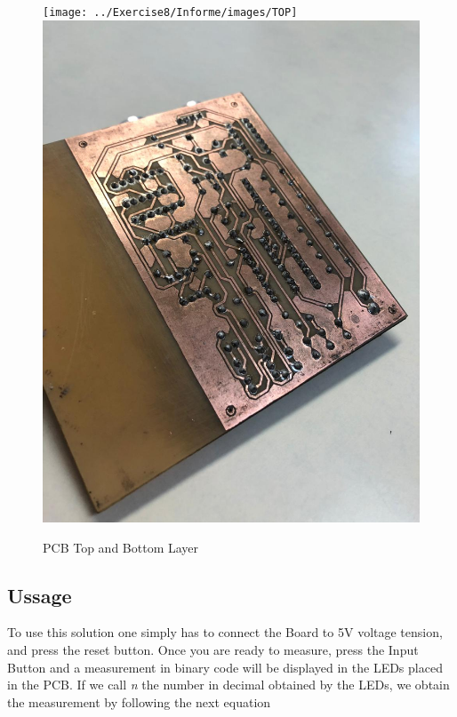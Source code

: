 \begin{figure}[h!]
\begin{centering}
\texttt{[image: ../Exercise8/Informe/images/TOP]} \includegraphics[scale=0.16]{../Exercise8/Informe/images/BOT}
\par\end{centering}
\caption{\color{cyan}PCB Top and Bottom Layer}

\end{figure}

\subsection{\color{purple}Ussage}

To use this solution one simply has to connect the Board to 5V voltage
tension, and press the reset button. Once you are ready to measure,
press the Input Button and a measurement in binary code will be displayed
in the LEDs placed in the PCB. If we call \emph{n} the number in decimal
obtained by the LEDs, we obtain the measurement by following the next
equation


